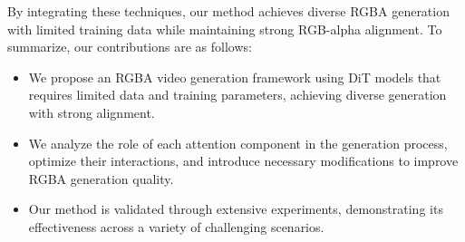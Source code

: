 By integrating these techniques, our method achieves diverse RGBA generation with limited training data while maintaining strong RGB-alpha alignment. To summarize, our contributions are as follows:
\begin{itemize}
    \item We propose an RGBA video generation framework using DiT models that requires limited data and training parameters, achieving diverse generation with strong alignment.
    \item We analyze the role of each attention component in the generation process, optimize their interactions, and introduce necessary modifications to improve RGBA generation quality.
    \item Our method is validated through extensive experiments, demonstrating its effectiveness across a variety of challenging scenarios.
\end{itemize} 



